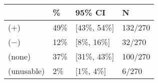\begin{tabular}{llll}
\hline
 & \% & 95\% CI  & N \\
\hline
(+) & 49\% & [43\%, 54\%] & 132/270\\
($-$) & 12\% & [8\%, 16\%] & 32/270\\
(none) & 37\% & [31\%, 43\%] & 100/270\\
(unusable) & 2\% & [1\%, 4\%] & 6/270\\
\hline
\end{tabular}
